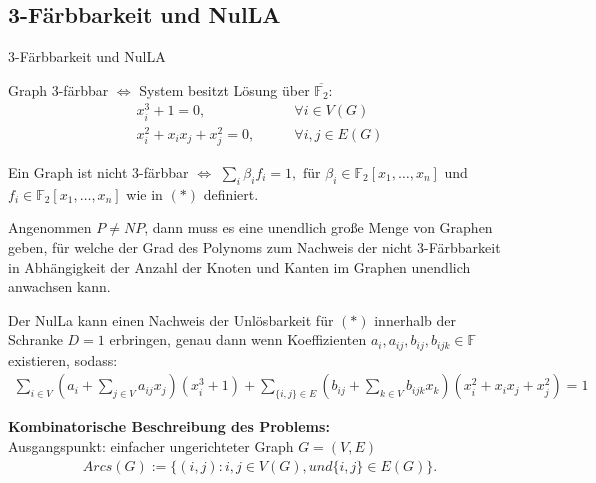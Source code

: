 \subsection{3-Färbbarkeit und NulLA}
\begin{mslide}{3-Färbbarkeit und NulLA}

Graph 3-färbbar $\Leftrightarrow$ System besitzt Lösung über $\overline{\mathbb{F}_2}$:
\begin{align*}
x_i^3+1=0, \qquad &\forall i \in V(G)\\
x_i^2+x_ix_j+x_j^2=0, \qquad &\forall{i,j}\in E(G) \tag{$\ast$} 
\end{align*}

\begin{kor}
Ein Graph ist nicht 3-färbbar $\Leftrightarrow$ $\sum_i \beta_if_i = 1, \text{ für } \beta_i \in \mathbb{F}_2[x_1,\ldots,x_n]$ und $f_i \in \mathbb{F}_2[x_1,\ldots,x_n]$ wie in  $(\ast)$ definiert. 
\end{kor}

\begin{lem}
Angenommen $P \not = NP$, dann muss es eine unendlich große Menge von Graphen geben, für welche der Grad des Polynoms zum Nachweis der nicht 3-Färbbarkeit in Abhängigkeit der Anzahl der Knoten und Kanten im Graphen unendlich anwachsen kann.
\end{lem}

\framebreak

\begin{definition} \label{Polynomdarstellung}
Der NulLa kann einen Nachweis der Unlösbarkeit für $(\ast)$ innerhalb der Schranke $D=1$ erbringen, genau dann wenn Koeffizienten $a_i, a_{ij}, b_{ij},b_{ijk} \in \mathbb{F}$ existieren, sodass:
\begin{align*}
\sum_{i \in V}\left(a_i + \sum_{j\in V}a_{ij}x_j\right)(x_i^3+1)+\sum_{\{i,j\}\in E}\left(b_{ij}+\sum_{k\in V}b_{ijk}x_k\right)(x_i^2+x_ix_j+x_j^2)=1
\end{align*}
\end{definition}

\framebreak

\textbf{Kombinatorische Beschreibung des Problems:} \\
Ausgangspunkt: einfacher ungerichteter Graph $G=(V,E)$ 
\begin{align*}
Arcs(G) := \{(i,j):i,j \in V(G), und \{i,j\}\in E(G)\}.
\end{align*}

\begin{definition} 
 

\end{definition}
\end{mslide}
